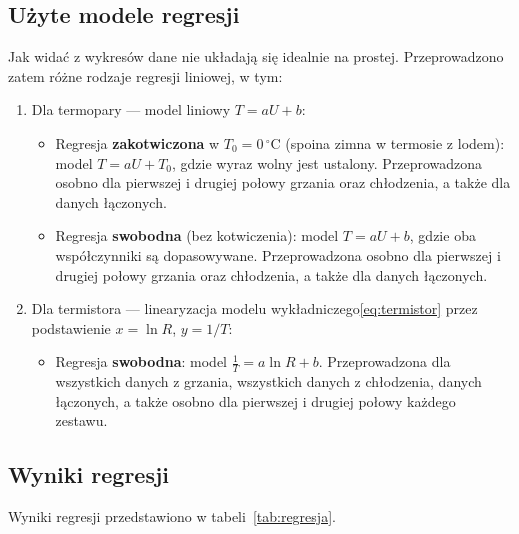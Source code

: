 \documentclass[12pt, a4paper]{article}
\begin{document}
\subsection{Użyte modele regresji}
Jak widać z wykresów dane nie układają się idealnie na prostej. Przeprowadzono
zatem różne rodzaje regresji liniowej, w tym:
\begin{enumerate}
    \item Dla termopary --- model liniowy $T = aU + b$:
          \begin{itemize}
              \item Regresja \textbf{zakotwiczona} w $T_0 = 0\,^\circ\mathrm{C}$ (spoina zimna w
                    termosie z lodem): model $T = aU + T_0$, gdzie wyraz wolny jest ustalony.
                    Przeprowadzona osobno dla pierwszej i drugiej połowy grzania oraz chłodzenia, a
                    także dla danych łączonych.
              \item Regresja \textbf{swobodna} (bez kotwiczenia): model $T = aU + b$, gdzie oba
                    współczynniki są dopasowywane. Przeprowadzona osobno dla pierwszej i drugiej
                    połowy grzania oraz chłodzenia, a także dla danych łączonych.
          \end{itemize}
    \item Dla termistora --- linearyzacja modelu wykładniczego\eqref{eq:termistor} przez
          podstawienie $x = \ln R$, $y = 1/T$:
          \begin{itemize}
              \item Regresja \textbf{swobodna}: model $\frac{1}{T} = a \ln R + b$. Przeprowadzona
                    dla wszystkich danych z grzania, wszystkich danych z chłodzenia, danych
                    łączonych, a także osobno dla pierwszej i drugiej połowy każdego zestawu.
          \end{itemize}
\end{enumerate}

\subsection{Wyniki regresji}
Wyniki regresji przedstawiono w tabeli~\ref{tab:regresja}.
\end{document}

